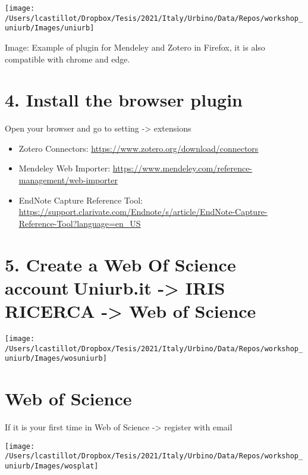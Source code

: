 \documentclass[
]{article}
\begin{document}
\begin{center}\texttt{[image: /Users/lcastillot/Dropbox/Tesis/2021/Italy/Urbino/Data/Repos/workshop\_uniurb/Images/uniurb]} \end{center}

Image: Example of plugin for Mendeley and Zotero in Firefox, it is also
compatible with chrome and edge.

\hypertarget{install-the-browser-plugin}{%
\section{4. Install the browser
plugin}\label{install-the-browser-plugin}}

Open your browser and go to setting -\textgreater{} extensions

\begin{itemize}
\item
  Zotero Connectors:
  \href{https://www.zotero.org/download/connectors}{\underline{https://www.zotero.org/download/connectors}}
\item
  Mendeley Web Importer:
  \href{https://www.mendeley.com/reference-management/web-importer}{\underline{https://www.mendeley.com/reference-management/web-importer}}
\item
  EndNote Capture Reference Tool:
  \href{https://support.clarivate.com/Endnote/s/article/EndNote-Capture-Reference-Tool?language=en_US}{\underline{https://support.clarivate.com/Endnote/s/article/EndNote-Capture-Reference-Tool?language=en\_US}}
\end{itemize}

\hypertarget{create-a-web-of-science-account-uniurb.it---iris-ricerca---web-of-science}{%
\section{5. Create a Web Of Science accountUniurb.it -\textgreater{}
IRIS RICERCA -\textgreater{} Web of
Science}\label{create-a-web-of-science-account-uniurb.it---iris-ricerca---web-of-science}}

\begin{center}\texttt{[image: /Users/lcastillot/Dropbox/Tesis/2021/Italy/Urbino/Data/Repos/workshop\_uniurb/Images/wosuniurb]} \end{center}

\hypertarget{web-of-science}{%
\section{Web of Science}\label{web-of-science}}

If it is your first time in Web of Science -\textgreater{} register with
email

\begin{center}\texttt{[image: /Users/lcastillot/Dropbox/Tesis/2021/Italy/Urbino/Data/Repos/workshop\_uniurb/Images/wosplat]} \end{center}
\end{document}
